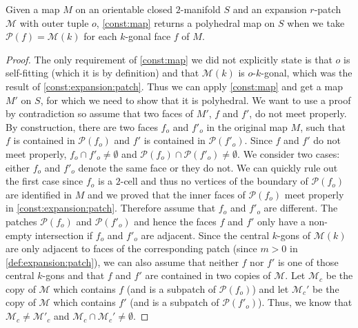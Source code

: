 \begin{proposition}\label{thm:const:polymap}
  Given a map $M$ on an orientable closed $2$-manifold $S$ and an expansion $r$-patch $\mathcal{M}$ with outer tuple $o$, \autoref{const:map} returns a polyhedral map on $S$ when we take $\mathcal{P}(f) = \mathcal{M}(k)$ for each $k$-gonal face $f$ of $M$.
\begin{proof}
The only requirement of \autoref{const:map} we did not explicitly state is that $o$ is self-fitting (which it is by definition) and that $\mathcal{M}(k)$ is $o$-$k$-gonal, which was the result of \autoref{const:expansion:patch}. Thus we can apply \autoref{const:map} and get a map $M'$ on $S$, for which we need to show that it is polyhedral. We want to use a proof by contradiction so assume that two faces of $M'$, $f$ and $f'$, do not meet properly. By construction, there are two faces $f_o$ and $f'_o$ in the original map $M$, such that $f$ is contained in $\mathcal{P}(f_o)$ and $f'$ is contained in $\mathcal{P}(f'_o)$. Since $f$ and $f'$ do not meet properly, $f_o \cap f'_o \neq \emptyset$ and $\mathcal{P}(f_o) \cap \mathcal{P}(f'_o) \neq \emptyset$. We consider two cases: either $f_o$ and $f'_o$ denote the same face or they do not. We can quickly rule out the first case since $f_o$ is a $2$-cell and thus no vertices of the boundary of $\mathcal{P}(f_o)$ are identified in $M$ and we proved that the inner faces of $\mathcal{P}(f_o)$ meet properly in \autoref{const:expansion:patch}. Therefore assume that $f_o$ and $f'_o$ are different. The patches $\mathcal{P}(f_o)$ and $\mathcal{P}(f'_o)$ and hence the faces $f$ and $f'$ only have a non-empty intersection if $f_o$ and $f'_o$ are adjacent. Since the central $k$-gons of $\mathcal{M}(k)$ are only adjacent to faces of the corresponding patch (since $m > 0$ in \autoref{def:expansion:patch}), we can also assume that neither $f$ nor $f'$ is one of those central $k$-gons and that $f$ and $f'$ are contained in two copies of $\mathcal{M}$. Let $\mathcal{M}_c$ be the copy of $\mathcal{M}$ which contains $f$ (and is a subpatch of $\mathcal{P}(f_o)$) and let $\mathcal{M}_c'$ be the copy of $\mathcal{M}$ which contains $f'$ (and is a subpatch of $\mathcal{P}(f'_o)$). Thus, we know that $\mathcal{M}_c \neq \mathcal{M}'_c$ and $\mathcal{M}_c \cap \mathcal{M}_c' \neq \emptyset$.


\end{proof}
\end{proposition}
